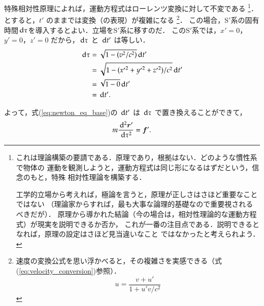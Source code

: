     特殊相対性原理によれば，運動方程式はローレンツ変換に対して不変である
        \footnote{
            これは理論構築の要請である．原理であり，根拠はない．どのような慣性系で物体の
            運動を観測しようと，運動方程式は同じ形になるはずだという，信念のもと，特殊
            相対性理論を構築する．

            工学的立場から考えれば，極論を言うと，原理が正しさはさほど重要なことではない
            （理論家からすれば，最も大事な論理的基礎なので重要視されるべきだが）．
            原理から導かれた結論（今の場合は，相対性理論的な運動方程式）が現実を説明できるか否か，
            これが一番の注目点である．説明できるとなれば，原理の設定はさほど見当違いなこと
            ではなかったと考えられよう．
        }．
    とすると，$t'$ のままでは変換（の表現）が複雑になる
        \footnote{
            速度の変換公式を思い浮かべると，その複雑さを実感できる（式(\ref{eq:velocity_conversion})参照）．
                \[
                    u=\frac{v+u'}{1+u'v/{c}^{2}}
                \]
        }．
    この場合，S$'$系の固有時間$\,\mathrm{d} \tau$を導入するとよい．立場をS$'$系に移すのだ．
    このS$'$系では，$x'=0$，$y'=0$，$z'=0$ だから，$\,\mathrm{d} \tau$ と $\,\mathrm{d} t'$ は等しい．
        \begin{align*}
            \,\mathrm{d} \tau &= \sqrt{1-\left(v^{2}/c^{2}\right)}\,\mathrm{d} t' \\
                 &= \sqrt{1-({x'}^{2}+{y'}^{2}+{z'}^{2})/c^{2}}\,\mathrm{d} t'\\
                 &= \sqrt{1-0}\,\mathrm{d} t'\\
                 &= \,\mathrm{d} t'.
        \end{align*}

    よって，式(\ref{eq:newton_eq_base})の $\,\mathrm{d} t'$ は $\,\mathrm{d} \tau$ で置き換えることができて，
    \begin{equation}\label{eq:newton_eq_tau_version}
        m\frac{\df^{2} \br'}{\df {\tau}^{2}} = \bldf'.
    \end{equation}

